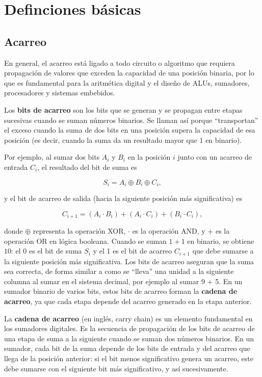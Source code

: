 
\chapter{Definciones básicas}

\section{Acarreo} \label{Sec:A-Acarreo}

En general, el acarreo está ligado a todo circuito o algoritmo que requiera propagación de valores que exceden la capacidad de una posición binaria, por lo que es fundamental para la aritmética digital y el diseño de ALUs, sumadores, procesadores y sistemas embebidos.

Los \textbf{bits de acarreo} son los bits que se generan y se propagan entre etapas sucesivas cuando se suman números binarios. Se llaman así porque ``transportan'' el exceso cuando la suma de dos bits en una posición supera la capacidad de esa posición (es decir, cuando la suma da un resultado mayor que 1 en binario).

Por ejemplo, al sumar dos bits \(A_i\) y \(B_i\) en la posición \(i\) junto con un acarreo de entrada \(C_i\), el resultado del bit de suma es

\[
S_i = A_i \oplus B_i \oplus C_i,
\]

y el bit de acarreo de salida (hacia la siguiente posición más significativa) es

\[
C_{i+1} = (A_i \cdot B_i) + (A_i \cdot C_i) + (B_i \cdot C_i),
\]

donde \(\oplus\) representa la operación XOR, \(\cdot\) es la operación AND, y \(+\) es la operación OR en lógica booleana. Cuando se suman \(1 + 1\) en binario, se obtiene \(10\): el 0 es el bit de suma \(S_i\) y el 1 es el bit de acarreo \(C_{i+1}\) que debe sumarse a la siguiente posición más significativa. Los bits de acarreo aseguran que la suma sea correcta, de forma similar a como se ``lleva'' una unidad a la siguiente columna al sumar en el sistema decimal, por ejemplo al sumar 9 + 5. En un sumador binario de varios bits, estos bits de acarreo forman la \textbf{cadena de acarreo}, ya que cada etapa depende del acarreo generado en la etapa anterior.

La \textbf{cadena de acarreo} (en inglés, carry chain) es un elemento fundamental en los sumadores digitales. Es la secuencia de propagación de los bits de acarreo de una etapa de suma a la siguiente cuando se suman dos números binarios. En un sumador, cada bit de la suma depende de los bits de entrada y del acarreo que llega de la posición anterior: si el bit menos significativo genera un acarreo, este debe sumarse con el siguiente bit más significativo, y así sucesivamente.


